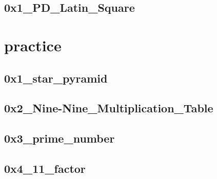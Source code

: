     \subsection{0x1_PD_Latin_Square}
        

\section{practice}
    \subsection{0x1_star_pyramid}
            
    \subsection{0x2_Nine-Nine_Multiplication_Table}
        
    \subsection{0x3_prime_number}
        
    \subsection{0x4_11_factor}
        